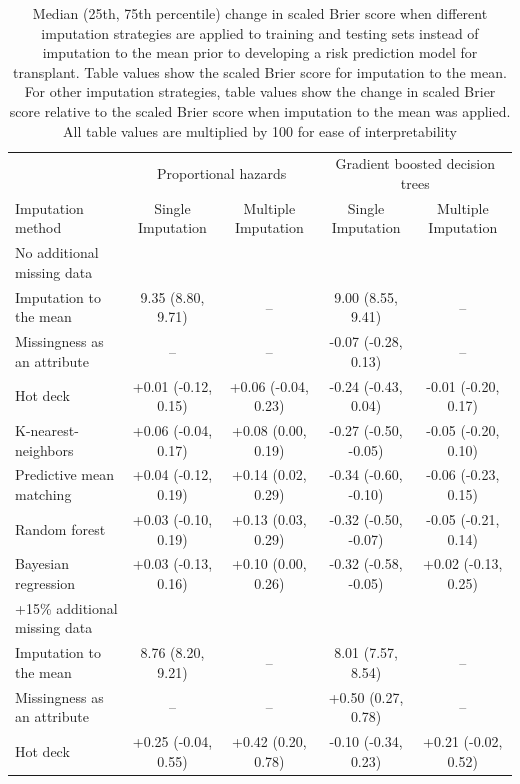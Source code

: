 \documentclass{article}
\begin{document}
\begin{table} 
 \caption{Median (25th, 75th percentile) change in scaled Brier score when different imputation strategies are applied to training and testing sets instead of imputation to the mean prior to developing a risk prediction model for transplant. Table values show the scaled Brier score for imputation to the mean. For other imputation strategies, table values show the change in scaled Brier score relative to the scaled Brier score when imputation to the mean was applied. All table values are multiplied by 100 for ease of interpretability} 
\label{tbl_md_strat_txpl_ipa} 
 
\begin{tabular}{lcccc}
\toprule
& \multicolumn{2}{c}{Proportional hazards} & \multicolumn{2}{c}{Gradient boosted decision trees} \\ 
 \cmidrule(lr){2-3}\cmidrule(lr){4-5}
Imputation method & Single Imputation & Multiple Imputation & Single Imputation & Multiple Imputation \\ 
\midrule
\multicolumn{1}{l}{No additional missing data} \\ 
\midrule
Imputation to the mean & 9.35 (8.80, 9.71) & -- & 9.00 (8.55, 9.41) & -- \\ 
Missingness as an attribute & -- & -- & -0.07 (-0.28, 0.13) & -- \\ 
Hot deck & +0.01 (-0.12, 0.15) & +0.06 (-0.04, 0.23) & -0.24 (-0.43, 0.04) & -0.01 (-0.20, 0.17) \\ 
K-nearest-neighbors & +0.06 (-0.04, 0.17) & +0.08 (0.00, 0.19) & -0.27 (-0.50, -0.05) & -0.05 (-0.20, 0.10) \\ 
Predictive mean matching & +0.04 (-0.12, 0.19) & +0.14 (0.02, 0.29) & -0.34 (-0.60, -0.10) & -0.06 (-0.23, 0.15) \\ 
Random forest & +0.03 (-0.10, 0.19) & +0.13 (0.03, 0.29) & -0.32 (-0.50, -0.07) & -0.05 (-0.21, 0.14) \\ 
Bayesian regression & +0.03 (-0.13, 0.16) & +0.10 (0.00, 0.26) & -0.32 (-0.58, -0.05) & +0.02 (-0.13, 0.25) \\ 
\midrule
\multicolumn{1}{l}{+15\% additional missing data} \\ 
\midrule
Imputation to the mean & 8.76 (8.20, 9.21) & -- & 8.01 (7.57, 8.54) & -- \\ 
Missingness as an attribute & -- & -- & +0.50 (0.27, 0.78) & -- \\ 
Hot deck & +0.25 (-0.04, 0.55) & +0.42 (0.20, 0.78) & -0.10 (-0.34, 0.23) & +0.21 (-0.02, 0.52) \\ 

\end{tabular}
\end{table}
\end{document}
